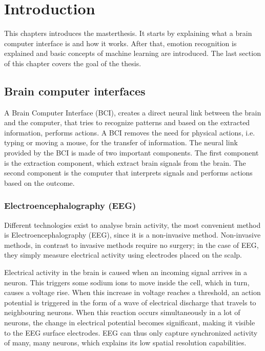 \chapter{Introduction}
{\samenvatting This chapters introduces the masterthesis. It starts by explaining what a brain computer interface is and how it works. After that, emotion recognition is explained and basic concepts of machine learning are introduced. The last section of this chapter covers the goal of the thesis.}


\section{Brain computer interfaces}

A Brain Computer Interface (BCI), creates a direct neural link between the brain and the computer\cite{LangModel}, that tries to recognize patterns and based on the extracted information, performs actions. A BCI removes the need for physical actions, i.e. typing or moving a mouse, for the transfer of information. The neural link provided by the BCI is made of two important components. The first component is the extraction component, which extract brain signals from the brain. The second component is the computer that interprets signals and performs actions based on the outcome.


\subsection{Electroencephalography (EEG)}
Different technologies exist to analyse brain activity, the most convenient method is Electroencephalography (EEG), since it is a non-invasive method. Non-invasive methods, in contrast to invasive methods require no surgery; in the case of EEG, they simply measure electrical activity using electrodes placed on the scalp.

\npar

Electrical activity in the brain is caused when an incoming signal arrives in a neuron. This triggers some sodium ions to move inside the cell, which in turn, causes a voltage rise\cite{ExtendedPaper}. When this increase in voltage reaches a threshold, an action potential is triggered in the form of a wave of electrical discharge that travels to neighbouring neurons. When this reaction occurs simultaneously in a lot of neurons, the change in electrical potential becomes significant, making it visible to the EEG surface electrodes. EEG can thus only capture synchronized activity of many, many neurons, which explains its low spatial resolution capabilities.

